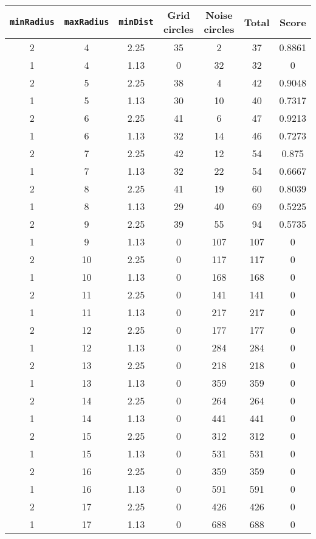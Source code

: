 \documentclass[letterpaper, 12pt]{article}
\begin{document}
\begin{longtable}{|c|c|c|c|c|c|c|}
\hline
\textbf{\texttt{minRadius}} & \textbf{\texttt{maxRadius}} & \textbf{\texttt{minDist}} & \textbf{Grid circles} & \textbf{Noise circles} & \textbf{Total} & \textbf{Score} \\
\hline
2 & 4 & 2.25 & 35 & 2 & 37 & 0.8861 \\
\hline
1 & 4 & 1.13 & 0 & 32 & 32 & 0 \\
\hline
2 & 5 & 2.25 & 38 & 4 & 42 & 0.9048 \\
\hline
1 & 5 & 1.13 & 30 & 10 & 40 & 0.7317 \\
\hline
2 & 6 & 2.25 & 41 & 6 & 47 & 0.9213 \\
\hline
1 & 6 & 1.13 & 32 & 14 & 46 & 0.7273 \\
\hline
2 & 7 & 2.25 & 42 & 12 & 54 & 0.875 \\
\hline
1 & 7 & 1.13 & 32 & 22 & 54 & 0.6667 \\
\hline
2 & 8 & 2.25 & 41 & 19 & 60 & 0.8039 \\
\hline
1 & 8 & 1.13 & 29 & 40 & 69 & 0.5225 \\
\hline
2 & 9 & 2.25 & 39 & 55 & 94 & 0.5735 \\
\hline
1 & 9 & 1.13 & 0 & 107 & 107 & 0 \\
\hline
2 & 10 & 2.25 & 0 & 117 & 117 & 0 \\
\hline
1 & 10 & 1.13 & 0 & 168 & 168 & 0 \\
\hline
2 & 11 & 2.25 & 0 & 141 & 141 & 0 \\
\hline
1 & 11 & 1.13 & 0 & 217 & 217 & 0 \\
\hline
2 & 12 & 2.25 & 0 & 177 & 177 & 0 \\
\hline
1 & 12 & 1.13 & 0 & 284 & 284 & 0 \\
\hline
2 & 13 & 2.25 & 0 & 218 & 218 & 0 \\
\hline
1 & 13 & 1.13 & 0 & 359 & 359 & 0 \\
\hline
2 & 14 & 2.25 & 0 & 264 & 264 & 0 \\
\hline
1 & 14 & 1.13 & 0 & 441 & 441 & 0 \\
\hline
2 & 15 & 2.25 & 0 & 312 & 312 & 0 \\
\hline
1 & 15 & 1.13 & 0 & 531 & 531 & 0 \\
\hline
2 & 16 & 2.25 & 0 & 359 & 359 & 0 \\
\hline
1 & 16 & 1.13 & 0 & 591 & 591 & 0 \\
\hline
2 & 17 & 2.25 & 0 & 426 & 426 & 0 \\
\hline
1 & 17 & 1.13 & 0 & 688 & 688 & 0 \\

\end{longtable}
\end{document}

